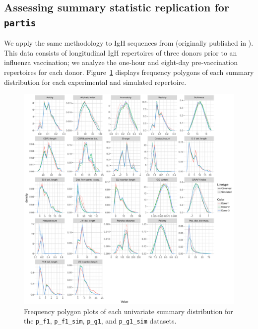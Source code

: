 \documentclass{article}
\newcommand{\partis}{\texttt{partis}}
\begin{document}
\subsection*{Assessing summary statistic replication for \partis}
We apply the same methodology to IgH sequences from \cite{Gupta2017-ve} (originally published in \cite{Laserson2014-dx}).
This data consists of longitudinal IgH repertoires of three donors prior to an influenza vaccination; we analyze the one-hour and eight-day pre-vaccination repertoires for each donor.
Figure~\ref{fig:PartisFreqPolys} displays frequency polygons of each summary distribution for each experimental and simulated repertoire.
\begin{figure}
    \includegraphics[width=\linewidth]{Figures/PartisScores/partis_freqpoly.pdf}
    \caption{Frequency polygon plots of each univariate summary distribution for the \texttt{p\_f1}, \texttt{p\_f1\_sim}, \texttt{p\_g1}, and \texttt{p\_g1\_sim} datasets.}
    \label{fig:PartisFreqPolys}
\end{figure}
\end{document}
